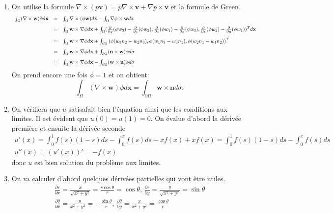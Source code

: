 \documentclass[12pt,a4paper]{article}
\newcommand{\dxx}{\frac{\partial}{\partial x}}
\newcommand{\dxy}{\frac{\partial }{\partial y}}
\newcommand{\dxz}{\frac{\partial}{\partial z}}
\newcommand{\drx}{\frac{\partial r}{\partial x}}
\newcommand{\dry}{\frac{\partial r}{\partial y}}
\newcommand{\dox}{\frac{\partial \theta}{\partial x}}
\newcommand{\doy}{\frac{\partial \theta}{\partial y}}
\begin{document}
\begin{enumerate}
\item 
On utilise la formule $\nabla\times (p\mathbf{v}) = p \nabla\times \mathbf{v}+ \nabla p \times \mathbf{v}$ et la formule de Green.
	$$
{\begin{array}{ccl}
	 \int_{\Omega}(\nabla\times \mathbf{w})\phi d\mathbf{x}&=& \int_{\Omega}\nabla\times (\phi \mathbf{w})d\mathbf{x}-\int_{\Omega}\nabla\phi\times \mathbf{w} d\mathbf{x}\vspace{0.3cm}\\
	&=& \int_{\Omega} \mathbf{w} \times \nabla\phi d\mathbf{x}+\int_{\Omega}(\dxy (\phi w_3)-\dxz (\phi w_2), \dxz (\phi w_1)-\dxx (\phi w_3), \dxx (\phi w_2)-\dxy (\phi w_1))^T d \mathbf{x}\vspace{0.3cm}\\
	&=& \int_{\Omega} \mathbf{w} \times \nabla\phi d\mathbf{x}+\int_{\partial \Omega} \left(\phi(w_3 n_2-w_2n_3),\phi(w_1n_3-w_3n_1),\phi(w_2n_1-w_1n_2)\right)^T \vspace{0.3cm}\\
	&=&\int_{\Omega} \mathbf{w} \times \nabla\phi d\mathbf{x}+\int_{\partial\Omega}(\mathbf{n}\times \mathbf{w})\phi d\sigma \vspace{0.3cm}\\
	&=&\int_{\Omega} \mathbf{w} \times \nabla\phi d\mathbf{x}-\int_{\partial\Omega}(\mathbf{w}\times \mathbf{n})\phi d\sigma
	\end{array}}
$$
On prend encore une fois $\phi=1$ et on obtient:
	$$\int_{\Omega}(\nabla\times \mathbf{w})\phi d\mathbf{x}=\int_{\partial\Omega}\mathbf{w}\times \mathbf{n}d\sigma.$$
\item On v\'erifiera que $u$ satisafait bien l'\'equation ainsi que
  les conditions aux limites. Il est \'evident que $u(0)=u(1)=0$. On
  \'evalue d'abord la d\'eriv\'ee premi\`ere et ensuite la d\'eriv\'ee seconde
$$
\begin{array}{l}
u'(x)=\int_0^1f(s)(1-s)ds -\int_0^x f(s)ds - xf(x)+
xf(x)=\int_0^1f(s)(1-s)ds -\int_0^x f(s)ds\\
u''(x) = (u'(x))'=-f(x)
\end{array}
$$
donc $u$ est bien solution du probl\`eme aux limites.
\item On va calculer d'abord quelques d\'eriv\'ees partielles qui vont \^etre utiles. 
$$\begin{array}{l}
\displaystyle\drx=\frac{x}{\sqrt{x^2+y^2}}=\frac{r\cos\theta}{r}=\cos\theta,\, \dry=\frac{y}{\sqrt{x^2+y^2}}=\sin\theta\\
\displaystyle\dox=\frac{-y}{x^2+y^2}=-\frac{\sin\theta}{r},\, \doy=\frac{x}{x^2+y^2}=\frac{\cos\theta}{r}

\end{array}$$
\end{enumerate}
\end{document}
